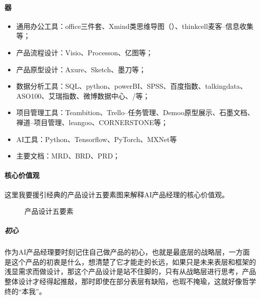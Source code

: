 \documentclass[letterpaper,11pt,english]{sphinxmanual}
\begin{document}
\paragraph{器}
\label{\detokenize{chapter_introduction/ability:id15}}\begin{itemize}
\item {} 
通用办公工具：office三件套、Xmind类思维导图（）、think\sphinxhyphen{}cell麦客–信息收集等；

\item {} 
产品流程设计：Visio、Processon、亿图等；

\item {} 
产品原型设计：Axure、Sketch、墨刀等；

\item {} 
数据分析工具：SQL、python、powerBI、SPSS、百度指数、talkingdata、ASO100、艾瑞指数、微博数据中心、/等；

\item {} 
项目管理工具：Teambition、Trello–任务管理、Demoo\sphinxhyphen{}原型展示、石墨文档、禅道–项目管理、leangoo、CORNERSTONE等；

\item {} 
AI工具：Python、Tensorflow、PyTorch、MXNet等

\item {} 
主要文档：MRD、BRD、PRD；

\end{itemize}


\paragraph{核心价值观}
\label{\detokenize{chapter_introduction/ability:id16}}
这里我要援引经典的产品设计五要素图来解释AI产品经理的核心价值观。

\begin{figure}[H]
\centering
\capstart

\noindent{}
\caption{产品设计五要素}\label{\detokenize{chapter_introduction/ability:id21}}\end{figure}


\subparagraph{初心}
\label{\detokenize{chapter_introduction/ability:id17}}
作为AI产品经理要时刻记住自己做产品的初心，也就是最底层的战略层，一方面是这个产品的初衷是什么，想清楚了它才能走的长远，如果只是未来表层和框架的浅显需求而做设计，那这个产品设计是站不住脚的，只有从战略层进行思考，产品整体设计才经得起推敲，那时即使在部分表层有缺陷，也瑕不掩瑜，这就好像哲学终的“本我”。
\end{document}
